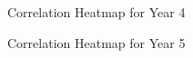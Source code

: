 \begin{figure}
\centering
{}
\caption{Correlation Heatmap for Year 4 }
\end{figure}

\begin{figure}
\centering
{}
\caption{Correlation Heatmap for Year 5 }
\end{figure}